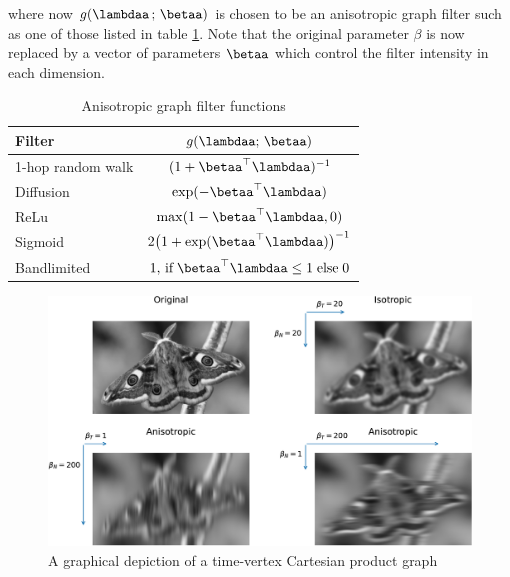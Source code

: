 where now $g(\lambdaa \,; \, \betaa)$ is chosen to be an anisotropic graph filter such as one of those listed in table \ref{tab:anis_filters}. Note that the original parameter $\beta$ is now replaced by a vector of parameters $\betaa$ which control the filter intensity in each dimension.


\begin{table}[t]
    \def\arraystretch{1.7}
    \small
    \begin{center}
        \begin{tabular}{|l|c|}
            \hline
            \textbf{Filter}   & $g(\lambdaa; \,\betaa)$                                            \\
            \hline
            1-hop random walk & $(1 + \betaa^\top\lambdaa)^{-1}$                                   \\
            \hline
            Diffusion         & $\exp(-\betaa^\top\lambdaa)$                                       \\
            \hline
            ReLu              & $\max (1 - \betaa^\top\lambdaa, 0)$                                \\
            \hline
            Sigmoid           & $2 \big( 1 + \exp(\betaa^\top\lambdaa)\big)^{-1}$                  \\
            \hline
            Bandlimited       & $1, \,\text{if} \; \betaa^\top\lambdaa \leq 1 \; \text{else} \; 0$ \\
            \hline
        \end{tabular}
    \end{center}
    \caption{Anisotropic graph filter functions}
    \label{tab:anis_filters}
\end{table}


\begin{figure}[t]
    \includegraphics[width=0.9\linewidth]{Figures/filter_types_butterfly.pdf}
    \caption[A time-vertex Cartesian product graph]{A graphical depiction of a time-vertex Cartesian product graph}
    \label{fig:filters}
\end{figure}



